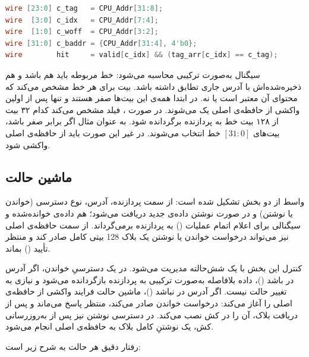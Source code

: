 \begin{latin}
    \begin{lstlisting}[language=Verilog]
wire [23:0] c_tag   = CPU_Addr[31:8];
wire  [3:0] c_idx   = CPU_Addr[7:4];
wire  [1:0] c_woff  = CPU_Addr[3:2];
wire [31:0] c_baddr = {CPU_Addr[31:4], 4'b0};
wire        hit     = valid[c_idx] && (tag_arr[c_idx] == c_tag);
    \end{lstlisting}
\end{latin}

سیگنال  به‌صورت ترکیبی محاسبه می‌شود: خط مربوطه باید هم  باشد و هم  ذخیره‌شده‌اش با  آدرس جاری تطابق داشته باشد. بیت  برای هر خط مشخص می‌کند که محتوای آن معتبر است یا نه. در ابتدا همه‌ی این بیت‌ها صفر هستند و تنها پس از اولین واکشی از حافظه‌ی اصلی یک می‌شوند. در صورت ، فیلد  مشخص می‌کند کدام ۳۲ بیت از ۱۲۸ بیت خط به پردازنده برگردانده شود. به عنوان مثال اگر  برابر صفر باشد، بیت‌های $[31:0]$ خط انتخاب می‌شوند. در غیر این صورت باید از حافظه‌ی اصلی واکشی شود.

\subsection{ماشین حالت}
واسط  از دو بخش تشکیل شده است: از سمت پردازنده، آدرس، نوع دسترسی (خواندن یا نوشتن) و در صورت نوشتن داده‌ی جدید دریافت می‌شود؛  هم داده‌ی خوانده‌شده و سیگنالی برای اعلام اتمام عملیات () به پردازنده برمی‌گرداند. از سمت حافظه‌ی اصلی نیز  می‌تواند درخواست خواندن یا نوشتن یک بلاک 128 بیتی کامل صادر کند و منتظر تأیید () بماند.

کنترل این بخش با یک  شش‌حالته مدیریت می‌شود. در یک دسترسیِ خواندن، اگر آدرس در  باشد ()، داده بلافاصله به‌صورت ترکیبی به پردازنده بازگردانده می‌شود و نیازی به تغییر حالت نیست. اگر آدرس در  نباشد ()، ماشین حالت فرایند واکشی از حافظه‌ی اصلی را آغاز می‌کند: درخواست خواندن صادر می‌کند، منتظر پاسخ می‌ماند و پس از دریافت بلاک، آن را در کش نصب می‌کند. در دسترسی نوشتن نیز پس از به‌روزرسانی کش، یک نوشتنِ کامل بلاک به حافظه‌ی اصلی انجام می‌شود.

رفتار دقیق هر حالت به شرح زیر است:


